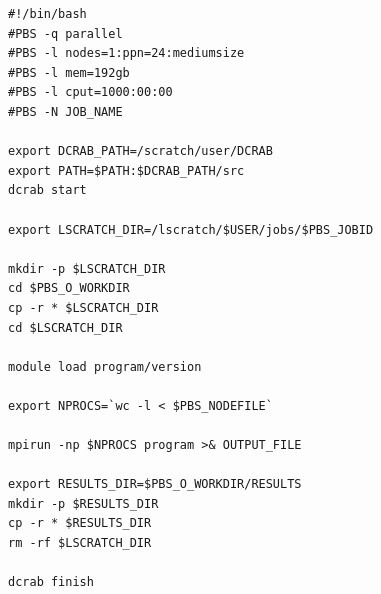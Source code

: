 \documentclass[10pt,a4paper]{report}
\begin{document}
\pagebreak

\begin{verbatim}
#!/bin/bash
#PBS -q parallel
#PBS -l nodes=1:ppn=24:mediumsize
#PBS -l mem=192gb
#PBS -l cput=1000:00:00
#PBS -N JOB_NAME

export DCRAB_PATH=/scratch/user/DCRAB
export PATH=$PATH:$DCRAB_PATH/src
dcrab start

export LSCRATCH_DIR=/lscratch/$USER/jobs/$PBS_JOBID

mkdir -p $LSCRATCH_DIR
cd $PBS_O_WORKDIR
cp -r * $LSCRATCH_DIR
cd $LSCRATCH_DIR

module load program/version

export NPROCS=`wc -l < $PBS_NODEFILE`

mpirun -np $NPROCS program >& OUTPUT_FILE

export RESULTS_DIR=$PBS_O_WORKDIR/RESULTS
mkdir -p $RESULTS_DIR
cp -r * $RESULTS_DIR
rm -rf $LSCRATCH_DIR

dcrab finish
\end{verbatim}
\end{document}
